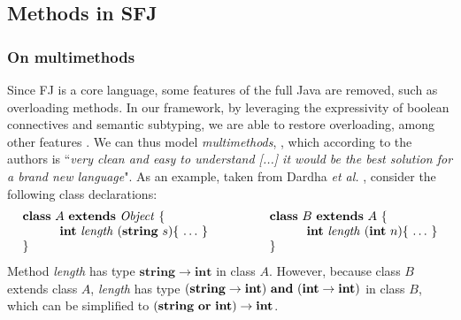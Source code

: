\documentclass[runningheads]{llncs}
\begin{document}


\subsection{Methods in SFJ}
\label{sec:methods}
\subsubsection{On multimethods}
Since FJ is a core language, some features of the full Java are removed, such as overloading methods.
In our framework, by leveraging the expressivity of boolean connectives and semantic subtyping, we are able to restore overloading, among other features \cite[\S 8.4]{Dardha2017}.
We can thus model \emph{multimethods}, \cite{BC97}, which according to the authors is ``\emph{very clean and easy to understand [...] it would be the best solution for a brand new language}".
As an example, taken from Dardha \emph{et al.}  \cite{Dardha2013,Dardha2017}, consider the following class declarations:
$$
\begin{array}{ll}
\mathbf{class} \  A \ \mathbf{extends }\  \mathit{Object}\ \{
&
\qquad
\mathbf{class} \  B \ \mathbf{extends }\  A\ \{
\\
	\qquad\quad \mathbf{int}\ \mathit{length}\ (\mathbf{string}\ s)\{\ \ldots\ \}\qquad
&
	\qquad\qquad\quad \mathbf{int}\ \mathit{length}\ (\mathbf{int}\ n)\{\ \ldots\ \}
\\
\}
&
\qquad \}
\end{array}
$$
Method {\it length} has type $\mathbf{string} \rightarrow \mathbf{int}$ in class $A$.
However, because class $B$ extends class $A$,  {\it length} has type $(\mathbf{string} \rightarrow \mathbf{int})\ \mathbf{and}\ (\mathbf{int} \rightarrow \mathbf{int})$ in class $B$,
which can be simplified to $(\mathbf{string}\ \mathbf{or}\ \mathbf{int}) \rightarrow \mathbf{int}$.
\end{document}
